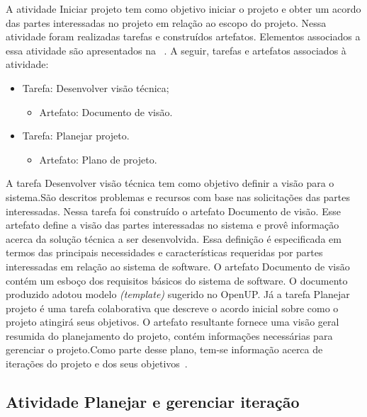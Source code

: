 A atividade Iniciar projeto tem como objetivo iniciar o projeto e obter um acordo das partes interessadas no projeto em relação ao escopo do projeto. 
Nessa atividade foram realizadas tarefas e construídos artefatos. Elementos associados a essa atividade são apresentados na ~. A seguir, tarefas e artefatos associados à atividade:

\begin{itemize}
    \item Tarefa: Desenvolver visão técnica;
        \begin{itemize}
            \item Artefato: Documento de visão.
        \end{itemize}
    \item Tarefa: Planejar projeto.
    \begin{itemize}
            \item Artefato: Plano de projeto.
        \end{itemize}
\end{itemize}


%

A tarefa Desenvolver visão técnica tem como objetivo definir a visão para o sistema.São descritos problemas e recursos com base nas solicitações das partes interessadas. 
Nessa tarefa foi construído o artefato Documento de visão. Esse artefato define a visão das partes interessadas no sistema e provê informação acerca da solução técnica a ser desenvolvida. Essa definição é especificada em termos das principais necessidades e características requeridas por partes interessadas em relação ao sistema de software. O artefato Documento de visão contém um esboço dos requisitos básicos do sistema de software. O documento produzido adotou modelo \emph{(template)} sugerido no OpenUP.
Já a tarefa Planejar projeto é uma tarefa colaborativa que descreve o acordo inicial sobre como o projeto atingirá seus objetivos. O artefato resultante  fornece uma visão geral resumida do planejamento do projeto, contém  informações necessárias para gerenciar o projeto.Como parte desse plano, tem-se informação acerca de iterações do projeto e dos seus objetivos~\cite{openup}.

\subsection{Atividade Planejar e gerenciar iteração}


